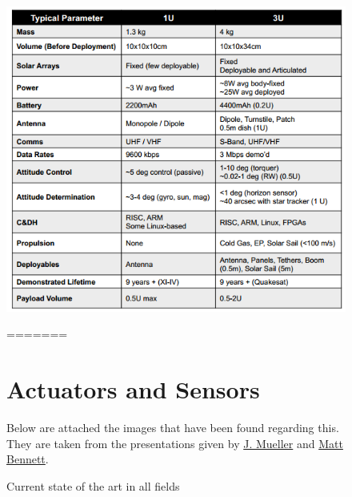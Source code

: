 \begin{figure}[!ht]
\begin{center}
\includegraphics[scale=0.7]{state_of_art.png}
\caption{Current state of the art in all fields}
\end{center}
=======
\section{Actuators and Sensors}

Below are attached the images that have been found regarding this. They are taken from the presentations given by \href{http://kiss.caltech.edu/workshops/smallsat2012b/presentations/mueller.pdf}{J.	Mueller} and \href{http://kiss.caltech.edu/workshops/smallsat2012b/presentations/bennett.pdf}{Matt Bennett}. 


\end{figure}
